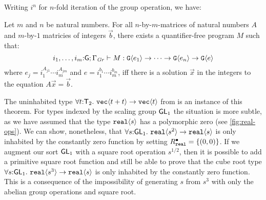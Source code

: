 Writing $i^n$ for $n$-fold iteration of the group operation, we have:
\begin{theorem}
  Let $m$ and $n$ be natural numbers. For all $n$-by-$m$-matrices of
  natural numbers $A$ and $m$-by-$1$ matricies of integers $\vec{b}$,
  there exists a quantifier-free program $M$ such that:
  \begin{displaymath}
    i_1,\dots,i_m\mathord:\mathsf{G}; \Gamma_{\mathit{Gr}} \vdash M : \textup{\texttt{G}}\langle e_1 \rangle \to \dots \to \textup{\texttt{G}}\langle e_n \rangle \to \textup{\texttt{G}}\langle e \rangle
  \end{displaymath}
  where $e_j = i_1^{A_{j1}}\cdots i_m^{A_{jm}}$ and $e = i_1^{b_1}\cdots i_m^{b_m}$, iff there is a solution $\vec{x}$
  in the integers to the equation $A \vec x = \vec{b}$.
\end{theorem}
The uninhabited type $\forall t \mathord: \mathsf{T}_2.\
\textup{\texttt{vec}}\langle t + t \rangle \to \textup{\texttt{vec}}\langle t \rangle$ from
 is an instance of this theorem.  For types
indexed by the scaling group $\mathsf{GL}_1$ the situation is more subtle,
as we have assumed that the type $\textup{\texttt{real}}\langle s \rangle$ has a polymorphic zero
(see \autoref{fig:real-ops}). We can show, nonetheless, that $\forall
s \mathord: \mathsf{GL}_1.\ \textup{\texttt{real}}\langle s^2 \rangle \to \textup{\texttt{real}}\langle s \rangle$ is
only inhabited by the constantly zero function by setting
$R^\bullet_{\textup{\texttt{real}}} = \{(0,0)\}$. If we augment our sort
$\mathsf{GL}_1$ with a square root operation $s^{1/2}$, then it is
possible to add a primitive square root function and still be able to
prove that the cube root type $\forall s \mathord: \mathsf{GL}_1.\
\textup{\texttt{real}}\langle s^3 \rangle \to \textup{\texttt{real}}\langle s \rangle$ is only inhabited by the
constantly zero function. This is a consequence of the impossibility
of generating $s$ from $s^3$ with only the abelian group operations
and square root.


